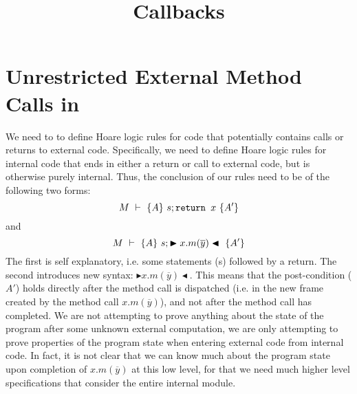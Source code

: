 \documentclass[11pt]{article} %
\title{Callbacks}
\date{} %
\theoremstyle{definition}
\begin{document}
\maketitle

\section{Unrestricted External Method Calls in \Nec}
We need to to define Hoare logic rules for code that potentially contains calls or returns to external
code. Specifically, we need to define Hoare logic rules for internal code that ends in either a return
or call to external code, but is otherwise purely internal. Thus, the conclusion of our rules need to be of the following two forms:
$$M\ \vdash\ \{A\}\ s; {\texttt{return }} x\ \{A'\}$$ and
$$M\ \vdash\ \{A\}\ s; \blacktriangleright x.m(\overline{y})\blacktriangleleft\ \{A'\}$$
The first is self explanatory, i.e. some statements (s) followed by a return. The second introduces new
syntax: $\blacktriangleright x.m(\overline{y}) \blacktriangleleft$. This means that the post-condition ($A'$)
holds directly after the method call is dispatched (i.e. in the new frame created by the method call $x.m(\overline{y})$), and not after the method call has completed.
We are not attempting to prove anything about the state of the program after some unknown 
external computation, we are only attempting to prove properties of the program state when entering 
external code from internal code. In fact, it is not clear that we can know much about the 
program state upon completion of $x.m(\overline{y})$ at this low level, for that we need much 
higher level \Nec specifications that consider the entire internal module.
\end{document}
